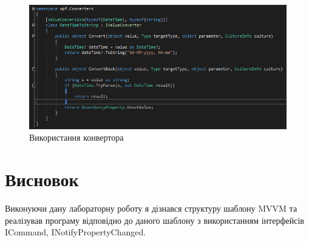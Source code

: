 \documentclass[14pt]{extreport}
\begin{document}
\begin{normalsize}
	\begin{figure}[H]
		\centering
		\includegraphics[scale=0.7]{4}
		\caption{Використання конвертора}
	\end{figure}
	\section*{Висновок}
	Виконуючи дану лабораторну роботу я дізнався структуру шаблону MVVM та реалізував програму відповідно до даного шаблону з використанням інтерфейсів ICommand, INotifyPropertyChanged.
	
	
	 
\end{normalsize}
\end{document}
